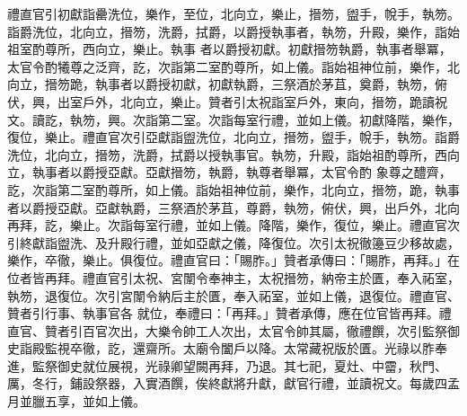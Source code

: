 \begin{pinyinscope}
 禮直官引初獻詣罍洗位，樂作，至位，北向立，樂止，搢笏，盥手，帨手，執笏。詣爵洗位，北向立，搢笏，洗爵，拭爵，以爵授執事者，執笏，升殿，樂作，詣始祖室酌尊所，西向立，樂止。執事
 者以爵授初獻。初獻搢笏執爵，執事者舉冪，太官令酌犧尊之泛齊，訖，次詣第二室酌尊所，如上儀。詣始祖神位前，樂作，北向立，搢笏跪，執事者以爵授初獻，初獻執爵，三祭酒於茅苴，奠爵，執笏，俯伏，興，出室戶外，北向立，樂止。贊者引太祝詣室戶外，東向，搢笏，跪讀祝文。讀訖，執笏，興。次詣第二室。次詣每室行禮，並如上儀。初獻降階，樂作，復位，樂止。禮直官次引亞獻詣盥洗位，北向立，搢笏，盥手，帨手，執笏。詣爵洗位，北向立，搢笏，洗爵，拭爵以授執事官。執笏，升殿，詣始祖酌尊所，西向立，執事者以爵授亞獻。亞獻搢笏，執爵，執尊者舉冪，太官令酌
 象尊之醴齊，訖，次詣第二室酌尊所，如上儀。詣始祖神位前，樂作，北向立，搢笏，跪，執事者以爵授亞獻。亞獻執爵，三祭酒於茅苴，尊爵，執笏，俯伏，興，出戶外，北向再拜，訖，樂止。次詣每室行禮，並如上儀。降階，樂作，復位，樂止。禮直官次引終獻詣盥洗、及升殿行禮，並如亞獻之儀，降復位。次引太祝徹籩豆少移故處，樂作，卒徹，樂止。俱復位。禮直官曰：「賜胙。」贊者承傳曰：「賜胙，再拜。」在位者皆再拜。禮直官引太祝、宮闈令奉神主，太祝搢笏，納帝主於匱，奉入祏室，執笏，退復位。次引宮闈令納后主於匱，奉入祏室，並如上儀，退復位。禮直官、贊者引行事、執事官各
 就位，奉禮曰：「再拜。」贊者承傳，應在位官皆再拜。禮直官、贊者引百官次出，大樂令帥工人次出，太官令帥其屬，徹禮饌，次引監祭御史詣殿監視卒徹，訖，還齋所。太廟令闔戶以降。太常藏祝版於匱。光祿以胙奉進，監祭御史就位展視，光祿卿望闕再拜，乃退。其七祀，夏灶、中霤，秋門、厲，冬行，鋪設祭器，入實酒饌，俟終獻將升獻，獻官行禮，並讀祝文。每歲四孟月並臘五享，並如上儀。



\end{pinyinscope}